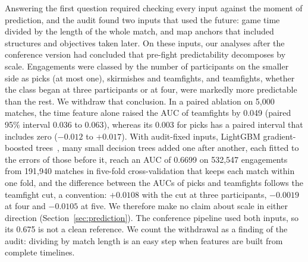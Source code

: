 Answering the first question required checking every input against the moment of prediction, and
the audit found two inputs that used the future: game time divided by the length of the whole
match, and map anchors that included structures and objectives taken later. On these inputs, our
analyses after the conference version had concluded that pre-fight predictability decomposes by
scale. Engagements were classed by the number of participants on the smaller side as picks (at most
one), skirmishes and teamfights, and teamfights, whether the class began at three participants or at
four, were markedly more predictable than the rest. We withdraw that conclusion. In a paired ablation
on 5,000 matches, the time feature alone raised the AUC of teamfights by 0.049 (paired 95\% interval
0.036 to 0.063), whereas its 0.003 for picks has a paired interval that includes zero ($-0.012$ to
$+0.017$). With audit-fixed inputs, LightGBM gradient-boosted trees~\cite{ke2017lightgbm}, many small
decision trees added one after another, each fitted to the errors of those before it, reach an
AUC of 0.6699 on 532,547 engagements from 191,940 matches in five-fold cross-validation that keeps
each match within one fold, and the difference between the AUCs of picks and teamfights follows
the teamfight cut, a convention: $+0.0108$ with the cut at three participants, $-0.0019$ at four and
$-0.0105$ at five. We therefore make no claim about scale in either direction
(Section~\ref{sec:prediction}). The conference
pipeline used both inputs, so its 0.675 is not a clean reference. We count the withdrawal as a
finding of the audit: dividing by match length is an easy step when features are built from
complete timelines.

